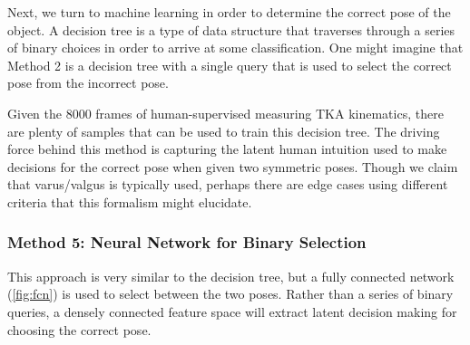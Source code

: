 Next, we turn to machine learning in order to determine the correct pose of the object. A decision tree is a type of data structure that traverses through a series of binary choices in order to arrive at some classification. One might imagine that Method 2 is a decision tree with a single query that is used to select the correct pose from the incorrect pose. 

Given the 8000 frames of human-supervised measuring TKA kinematics, there are plenty of samples that can be used to train this decision tree. The driving force behind this method is capturing the latent human intuition used to make decisions for the correct pose when given two symmetric poses. Though we claim that varus/valgus is typically used, perhaps there are edge cases using different criteria that this formalism might elucidate.

\subsubsection{Method 5: Neural Network for Binary Selection}
This approach is very similar to the decision tree, but a fully connected network (\cref{fig:fcn}) is used to select between the two poses. Rather than a series of binary queries, a densely connected feature space will extract latent decision making for choosing the correct pose.
